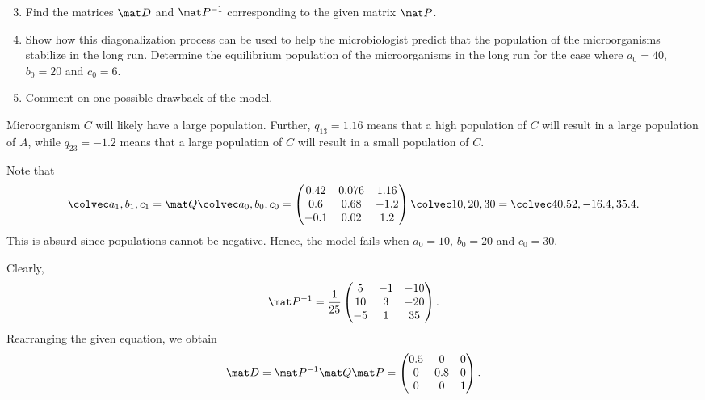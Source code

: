 \begin{problem}
    \begin{enumerate}
        \setcounter{enumi}{2}
        \item Find the matrices $\mat D$ and $\mat P^{-1}$ corresponding to the given matrix $\mat P$.
        \item Show how this diagonalization process can be used to help the microbiologist predict that the population of the microorganisms stabilize in the long run. Determine the equilibrium population of the microorganisms in the long run for the case where $a_0 = 40$, $b_0 = 20$ and $c_0 = 6$.
        \item Comment on one possible drawback of the model.
    \end{enumerate}
\end{problem}
\clearpage
\begin{solution}
    \begin{ppart}
        Microorganism $C$ will likely have a large population. Further, $q_{13} = 1.16$ means that a high population of $C$ will result in a large population of $A$, while $q_{23} = -1.2$ means that a large population of $C$ will result in a small population of $C$.
    \end{ppart}
    \begin{ppart}
        Note that \[\cveciii{a_1}{b_1}{c_1} = \mat Q\cveciii{a_{0}}{b_{0}}{c_{0}} = \begin{pmatrix}0.42 & 0.076 & 1.16 \\ 0.6 & 0.68 & -1.2 \\ -0.1 & 0.02 & 1.2\end{pmatrix} \cveciii{10}{20}{30} = \cveciii{40.52}{-16.4}{35.4}.\] This is absurd since populations cannot be negative. Hence, the model fails when $a_0 = 10$, $b_0 = 20$ and $c_0 = 30$.
    \end{ppart}
    \begin{ppart}
        Clearly, \[\mat P^{-1} = \frac1{25} \begin{pmatrix}5 & -1 & -10 \\ 10 & 3 & -20 \\ -5 & 1 & 35\end{pmatrix}.\] Rearranging the given equation, we obtain \[\mat D = \mat P^{-1} \mat Q \mat P = \begin{pmatrix}0.5 & 0 & 0 \\ 0 & 0.8 & 0 \\ 0 & 0 & 1\end{pmatrix}.\]
    \end{ppart}
    \begin{ppart}

\end{ppart}
\end{solution}
